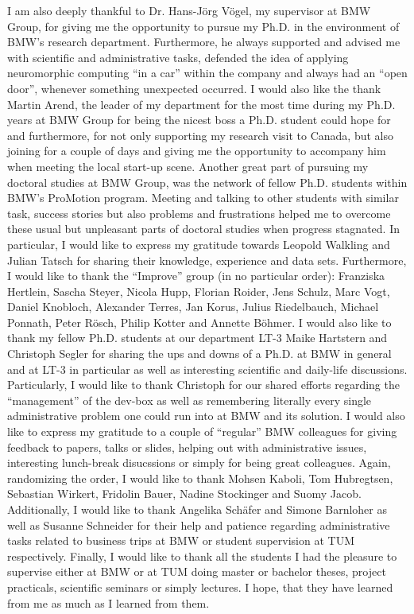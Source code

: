 I am also deeply thankful to Dr. Hans-J\"org V\"ogel, my supervisor at BMW Group, for giving me the opportunity to pursue my Ph.D. in the environment of BMW's research department.
Furthermore, he always supported and advised me with scientific and administrative tasks, defended the idea of applying neuromorphic computing \enquote{in a car} within the company and always had an \enquote{open door}, whenever something unexpected occurred.
I would also like the thank Martin Arend, the leader of my department for the most time during my Ph.D. years at BMW Group for being the nicest boss a Ph.D. student could hope for and furthermore, for not only supporting my research visit to Canada, but also joining for a couple of days and giving me the opportunity to accompany him when meeting the local start-up scene.
Another great part of pursuing my doctoral studies at BMW Group, was the network of fellow Ph.D. students within BMW's ProMotion program.
Meeting and talking to other students with similar task, success stories but also problems and frustrations helped me to overcome these usual but unpleasant parts of doctoral studies when progress stagnated.
In particular, I would like to express my gratitude towards Leopold Walkling and Julian Tatsch for sharing their knowledge, experience and data sets.
Furthermore, I would like to thank the \enquote{Improve} group (in no particular order): Franziska Hertlein, Sascha Steyer, Nicola Hupp, Florian Roider, Jens Schulz, Marc Vogt, Daniel Knobloch, Alexander Terres, Jan Korus, Julius Riedelbauch, Michael Ponnath, Peter R\"osch, Philip Kotter and Annette B\"ohmer.
I would also like to thank my fellow Ph.D. students at our department LT-3 Maike Hartstern and Christoph Segler for sharing the ups and downs of a Ph.D. at BMW in general and at LT-3 in particular as well as interesting scientific and daily-life discussions.
Particularly, I would like to thank Christoph for our shared efforts regarding the \enquote{management} of the dev-box as well as remembering literally every single administrative problem one could run into at BMW and its solution.
I would also like to express my gratitude to a couple of \enquote{regular} BMW colleagues for giving feedback to papers, talks or slides, helping out with administrative issues, interesting lunch-break disucssions or simply for being great colleagues.
Again, randomizing the order, I would like to thank Mohsen Kaboli, Tom Hubregtsen, Sebastian Wirkert, Fridolin Bauer, Nadine Stockinger and Suomy Jacob. 
Additionally, I would like to thank Angelika Sch\"afer and Simone Barnloher as well as Susanne Schneider for their help and patience regarding administrative tasks related to business trips at BMW or student supervision at TUM respectively.
Finally, I would like to thank all the students I had the pleasure to supervise either at BMW or at TUM doing master or bachelor theses, project practicals, scientific seminars or simply lectures.
I hope, that they have learned from me as much as I learned from them.

